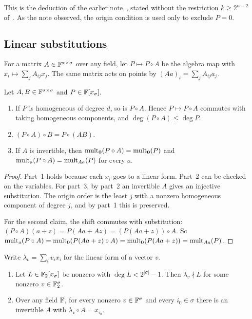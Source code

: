 This is the deduction of the earlier note~\cite{Note}, stated without the
restriction \(k\ge2^{n-2}\) of~\cite[Question~4.3]{BBDM23}. As the note
observed, the origin condition is used only to exclude \(P=0\).

\subsection{Linear substitutions}

For a matrix \(A\in\mathbb F^{\sigma\times\sigma}\) over any field, let \(P\mapsto P\circ A\) be
the algebra map with \(x_i\mapsto\sum_jA_{ij}x_j\). The same matrix acts on
points by \((Aa)_i=\sum_jA_{ij}a_j\).

\begin{lemma}\label{lem:subst}
Let \(A,B\in\mathbb F^{\sigma\times\sigma}\) and \(P\in\mathbb F[x_\sigma]\).
\begin{enumerate}
 \item If \(P\) is homogeneous of degree \(d\), so is \(P\circ A\). Hence
 \(P\mapsto P\circ A\) commutes with taking homogeneous components, and
 \(\deg(P\circ A)\le\deg P\).
 \item \((P\circ A)\circ B=P\circ(AB)\).
 \item If \(A\) is invertible, then \(\operatorname{mult}_{\mathbf 0}(P\circ A)=\operatorname{mult}_{\mathbf 0}(P)\) and
 \(\operatorname{mult}_a(P\circ A)=\operatorname{mult}_{Aa}(P)\) for every \(a\).
\end{enumerate}
\end{lemma}

\begin{proof}
Part~1 holds because each \(x_i\) goes to a linear form. Part~2 can be checked
on the variables. For part~3, by part~2 an invertible \(A\) gives an injective
substitution. The origin order is the least \(j\) with a nonzero homogeneous
component of degree \(j\), and by part~1 this is preserved.

For the second claim, the shift commutes with substitution:
\((P\circ A)(a+z)=P(Aa+Az)=(P(Aa+z))\circ A\). So
\(\operatorname{mult}_a(P\circ A)=\operatorname{mult}_{\mathbf 0}(P(Aa+z)\circ A)=\operatorname{mult}_{\mathbf 0}(P(Aa+z))=\operatorname{mult}_{Aa}(P)\).
\end{proof}

\begin{lemma}\label{lem:linear-form}
Write \(\lambda_v=\sum_iv_ix_i\) for the linear form of a vector \(v\).
\begin{enumerate}
 \item Let \(L\in\mathbb F_2[x_\sigma]\) be nonzero with \(\deg L<2^{|\sigma|}-1\). Then
 \(\lambda_v\nmid L\) for some nonzero \(v\in\mathbb F_2^\sigma\).
 \item Over any field \(\mathbb F\), for every nonzero \(v\in\mathbb F^\sigma\) and every
 \(i_0\in\sigma\) there is an invertible \(A\) with \(\lambda_v\circ A=x_{i_0}\).
\end{enumerate}
\end{lemma}

